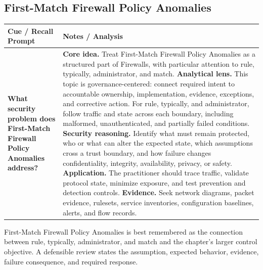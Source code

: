 \documentclass[11pt]{article}
\newcommand{\CornellHeader}{%
\rowcolor{Navy}\color{white}\bfseries Cue / Recall Prompt & \color{white}\bfseries Notes / Analysis\\\hline}
\newcommand{\CornellRow}[2]{%
\cellcolor{CueGray}\RaggedRight\textbf{#1} & \RaggedRight #2\\\hline}
\begin{document}
\subsection*{First-Match Firewall Policy Anomalies}
\begin{longtable}{>{\RaggedRight\arraybackslash}p{}|>{\RaggedRight\arraybackslash}p{}}
\CornellHeader
\CornellRow{What security problem does First-Match Firewall Policy Anomalies address?}{\textbf{Core idea.} Treat First-Match Firewall Policy Anomalies as a structured part of Firewalls, with particular attention to rule, typically, administrator, and match. \textbf{Analytical lens.} This topic is governance-centered: connect required intent to accountable ownership, implementation, evidence, exceptions, and corrective action. For rule, typically, and administrator, follow traffic and state across each boundary, including malformed, unauthenticated, and partially failed conditions. \textbf{Security reasoning.} Identify what must remain protected, who or what can alter the expected state, which assumptions cross a trust boundary, and how failure changes confidentiality, integrity, availability, privacy, or safety. \textbf{Application.} The practitioner should trace traffic, validate protocol state, minimize exposure, and test prevention and detection controls. \textbf{Evidence.} Seek network diagrams, packet evidence, rulesets, service inventories, configuration baselines, alerts, and flow records.}
\end{longtable}
\begin{topicsummary}
First-Match Firewall Policy Anomalies is best remembered as the connection between rule, typically, administrator, and match and the chapter's larger control objective. A defensible review states the assumption, expected behavior, evidence, failure consequence, and required response.
\end{topicsummary}
\end{document}
